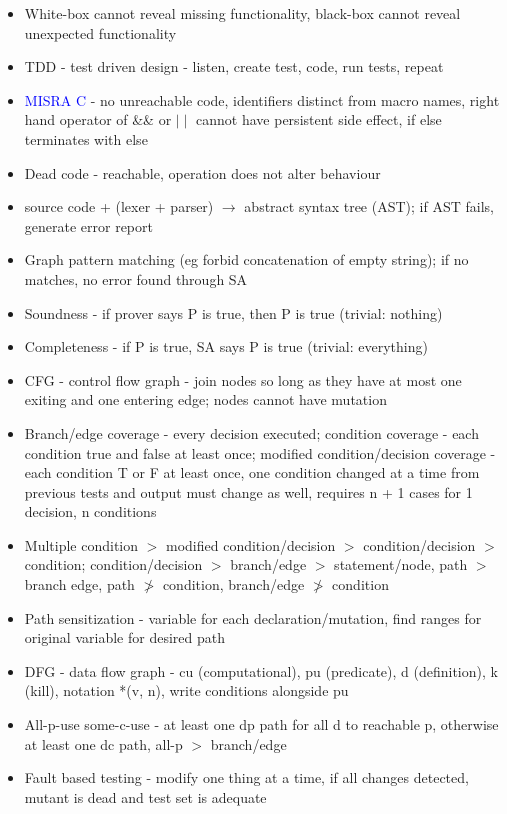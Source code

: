 \documentclass[10pt]{article}
\begin{document}
\begin{multicols}{2}
\begin{itemize}
        \item White-box cannot reveal missing functionality, black-box cannot reveal unexpected functionality
        \item TDD - test driven design - listen, create test, code, run tests, repeat 
        \item \textcolor{blue}{MISRA C} - no unreachable code, identifiers distinct from macro names, right hand operator of \&\& or $\mid\mid$ cannot have persistent side effect, if else terminates with else
        \item Dead code - reachable, operation does not alter behaviour
        \item source code + (lexer + parser) $\rightarrow$ abstract syntax tree (AST); if AST fails, generate error report
        \item Graph pattern matching (eg forbid concatenation of empty string); if no matches, no error found through SA 
        \item Soundness - if prover says P is true, then P is true (trivial: nothing) 
        \item Completeness - if P is true, SA says P is true (trivial: everything)
        \item CFG - control flow graph - join nodes so long as they have at most one exiting and one entering edge; nodes cannot have mutation
        \item Branch/edge coverage - every decision executed; condition coverage - each condition true and false at least once; modified condition/decision coverage - each condition T or F at least once, one condition changed at a time from previous tests and output must change as well, requires n + 1 cases for 1 decision, n conditions
        \item Multiple condition $>$ modified condition/decision $>$ condition/decision $>$ condition; condition/decision $>$ branch/edge $>$ statement/node, path $>$ branch edge, path $\ngtr$ condition, branch/edge $\ngtr$ condition
        \item Path sensitization - variable for each declaration/mutation, find ranges for original variable for desired path
        \item DFG - data flow graph - cu (computational), pu (predicate), d (definition), k (kill), notation *(v, n), write conditions alongside pu
        \item All-p-use some-c-use - at least one dp path for all d to reachable p, otherwise at least one dc path, all-p $>$ branch/edge
        \item Fault based testing - modify one thing at a time, if all changes detected, mutant is dead and test set is adequate

\end{itemize}
\end{multicols}
\end{document}
